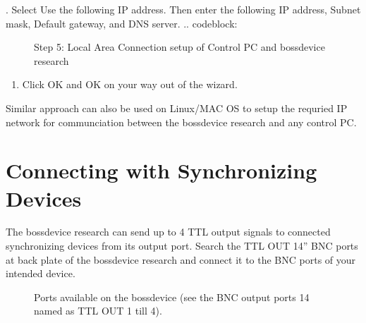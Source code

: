 \documentclass[letterpaper,10pt,english]{sphinxmanual}
\begin{document}
. Select Use the following IP address. Then enter the following IP address, Subnet mask, Default gateway, and DNS server.
.. code\sphinxhyphen{}block:

\begin{sphinxVerbatim}[commandchars=\\\{\}]
           
          
      
           
\end{sphinxVerbatim}

\begin{figure}[htbp]
\centering
\capstart

\noindent{}
\caption{Step 5: Local Area Connection setup of Control PC and bossdevice research}\label{\detokenize{2_setup_bossdevice_research:id4}}\end{figure}
\begin{enumerate}
%
\setcounter{enumi}{5}
\item {} 
\sphinxAtStartPar
Click OK and OK on your way out of the wizard.

\end{enumerate}

\sphinxAtStartPar
Similar approach can also be used on Linux/MAC OS to setup the requried IP network for communciation between the bossdevice research and any control PC.


\section{Connecting with Synchronizing Devices}
\label{\detokenize{2_setup_bossdevice_research:connecting-with-synchronizing-devices}}
\sphinxAtStartPar
The bossdevice research can send up to 4 TTL output signals to connected synchronizing devices from its output port. Search the TTL OUT 1\sphinxhyphen{}4” BNC ports at back plate of the bossdevice research and connect it to the BNC ports of your intended device.

\begin{figure}[htbp]
\centering
\capstart

\noindent{}
\caption{Ports available on the bossdevice (see the BNC output ports 1\sphinxhyphen{}4 named as TTL OUT 1 till 4).}\label{\detokenize{2_setup_bossdevice_research:id5}}\end{figure}
\end{document}

